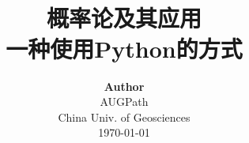 \title{ \normalsize \textsc{}
		\\ [2.0cm]
		\HRule{1.5pt} \\
		\LARGE \textbf{{概率论及其应用}
		\HRule{2.0pt} \\ [0.6cm] \LARGE{一种使用Python的方式} \vspace*{10\baselineskip}}
		}
\date{}
\author{\textbf{Author} \\ 
		AUGPath \\
		China Univ. of Geosciences \\
		\today}

\maketitle
\newpage

\tableofcontents
\newpage
